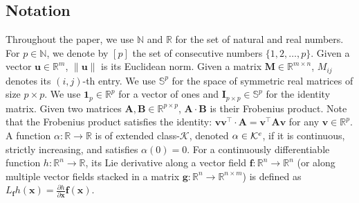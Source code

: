 \documentclass[10pt,a4paper]{amsart}
\newcommand{\naturals}{\mathbb{N}}
\newcommand{\real}{\mathbb{R}}
\newcommand{\until}[1]{[#1]}
\newcommand{\map}[3]{#1:#2 \rightarrow #3}
\newcommand{\Kc}{\mathcal{K}}
\newcommand{\Ke}{\Kc^{\rm e}}
\theoremstyle{definition}
\renewcommand{\bf}{\mathbf{f}} %
\newcommand{\bg}{\mathbf{g}}
\newcommand{\bu}{\mathbf{u}}
\newcommand{\bv}{\mathbf{v}}
\newcommand{\bx}{\mathbf{x}}
\newcommand{\bA}{\mathbf{A}}
\newcommand{\bB}{\mathbf{B}}
\newcommand{\bI}{\mathbf{I}}
\newcommand{\bM}{\mathbf{M}}
\begin{document}
\subsection{Notation}
Throughout the paper, we use $\naturals$ and $\real$ for the set of natural and real numbers. For $p\in\naturals$, we denote by $\until{p}$ the set of consecutive numbers $\{1,2,\ldots,p\}$. Given a vector $\bu\in\real^m$, $\|\bu\|$ is its Euclidean norm. Given a matrix $\bM\in\real^{m\times n}$, $M_{ij}$ denotes its $(i,j)$-th entry. We use $\mathbb S^p$ for the space of symmetric real matrices of size $p\times p$. 
We use $\mathbf{1}_p\in\real^p$ for a vector of ones and $\bI_{p\times p}\in\mathbb S^p$ for the identity matrix. Given two matrices $\bA,\bB\in\real^{p\times p}$, $\bA\cdot\bB$ is their Frobenius product. Note that the Frobenius product satisfies the identity: $\bv\bv^\top\cdot \bA = \bv^\top \bA\bv$ for any $\bv\in\real^p$. A function $\map{\alpha}{\real}{\real}$ is of extended class-$\Kc$, denoted $\alpha\in\Ke$, if it is continuous, strictly increasing, and satisfies $\alpha(0)=0$. For a continuously differentiable function $\map{h}{\real^n}{\real}$, its Lie derivative along a vector field $\map{\bf}{\real^n}{\real^n}$ (or along multiple vector fields stacked in a matrix $\map{\bg}{\real^n}{\real^{n\times m}}$) is defined as $L_\bf h(\bx)=\frac{\partial h}{\partial \bx} \bf(\bx)$.
\end{document}
